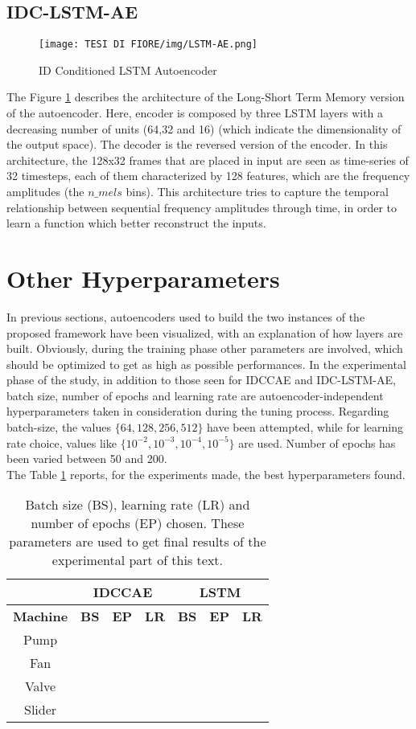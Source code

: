 \subsection{IDC-LSTM-AE}
\begin{figure}[ht]
\texttt{[image: TESI DI FIORE/img/LSTM-AE.png]}
\centering
\caption{ID Conditioned LSTM Autoencoder}
\label{LSTM-AE}
\end{figure}
The Figure \ref{LSTM-AE} describes the architecture of the Long-Short Term Memory version of the autoencoder. Here, encoder is composed by three LSTM layers with a decreasing number of units (64,32 and 16) (which indicate the dimensionality of the output space). The decoder is the reversed version of the encoder. In this architecture, the 128x32 frames that are placed in input are seen as time-series of 32 timesteps, each of them characterized by 128 features, which are the frequency amplitudes (the $n\_mels$ bins). This architecture tries to capture the temporal relationship between sequential frequency amplitudes through time, in order to learn a function which better reconstruct the inputs.

\section{Other Hyperparameters}
In previous sections, autoencoders used to build the two instances of the proposed framework have been visualized, with an explanation of how layers are built. Obviously, during the training phase other parameters are involved, which should be optimized to get as high as possible performances. In the experimental phase of the study, in addition to those seen for IDCCAE and IDC-LSTM-AE, batch size, number of epochs and learning rate are autoencoder-independent hyperparameters taken in consideration during the tuning process. Regarding batch-size, the values $\{64,128,256,512\}$ have been attempted, while for learning rate choice, values like $\{10^{-2}, 10^{-3}, 10^{-4}, 10^{-5}\}$ are used. Number of epochs has been varied between 50 and 200.\\
The Table \ref{hyperparam-tables} reports, for the experiments made, the best hyperparameters found.

\begin{table}[ht]
\centering
\begin{tabular}{|c|c|c|c|c|c|c|} 
\cline{2-7}
\multicolumn{1}{c|}{} & \multicolumn{3}{c|}{\textbf{IDCCAE}} & \multicolumn{3}{c|}{\textbf{LSTM}} \\
\hline
\textbf{Machine} & \textbf{BS} & \textbf{EP} & \textbf{LR} & \textbf{BS} & \textbf{EP} & \textbf{LR} \\ 
\hline
Pump &  &  &  &  &  &  \\ 
\hline
Fan &  &  &  &  &  &  \\ 
\hline
Valve &  &  &  &  &  &  \\ 
\hline
Slider &  &  &  &  &  &  \\
\hline
\end{tabular}
\caption{Batch size (BS), learning rate (LR) and number of epochs (EP) chosen. These parameters are used to get final results of the experimental part of this text.}
\label{hyperparam-tables}
\end{table}

